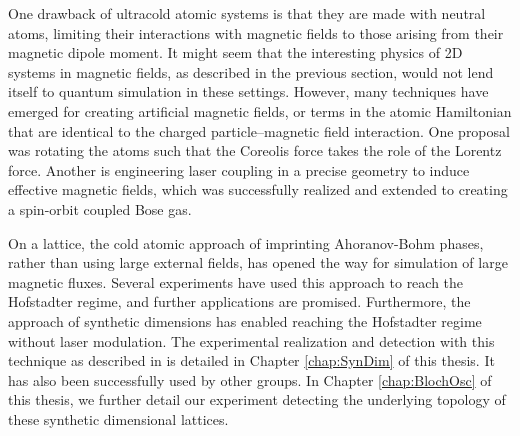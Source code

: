 One drawback of ultracold atomic systems is that they are made with neutral atoms, limiting their interactions with magnetic fields to those arising from their magnetic dipole moment. It might seem that the interesting physics of 2D systems in magnetic fields, as described in the previous section, would not lend itself to quantum simulation in these settings. However, many techniques have emerged for creating artificial magnetic fields, or terms in the atomic Hamiltonian that are identical to the charged particle--magnetic field interaction. One proposal was rotating the atoms such that the Coreolis force takes the role of the Lorentz force\cite{Cooper2008}. Another is engineering laser coupling in a precise geometry to induce effective magnetic fields\cite{Juzeliunas2006}, which was successfully realized\cite{Lin2009b} and extended to creating a spin-orbit coupled Bose gas\cite{Lin2011}. 

On a lattice, the cold atomic approach of imprinting Ahoranov-Bohm phases, rather than using large external fields, has opened the way for simulation of large magnetic fluxes\cite{Jaksch2003,Mueller2004,Sorensen2005}. Several experiments have used this approach to reach the Hofstadter regime\cite{Aidelsburger2013,Miyake2013,Jotzu2014,Aidelsburger2014,Mancini2015,An2017}, and further applications are promised\cite{Mazza2012}. Furthermore, the approach of synthetic dimensions\cite{Celi2014} has enabled reaching the Hofstadter regime without laser modulation. The experimental realization and detection with this technique as described in\cite{Stuhl2015} is detailed in Chapter \ref{chap:SynDim} of this thesis. It has also been successfully used by other groups\cite{Mancini2015,Meier2016}. In Chapter \ref{chap:BlochOsc} of this thesis, we further detail our experiment detecting the underlying topology of these synthetic dimensional lattices. 

